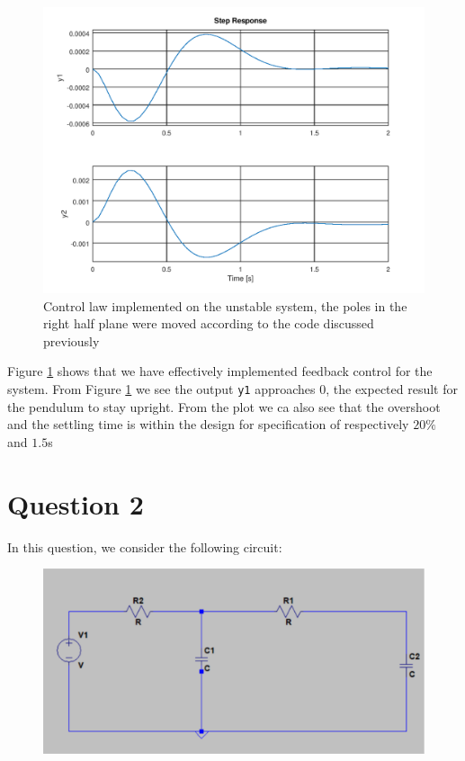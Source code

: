 \documentclass[a4paper, 12pt]{article}
\begin{document}
\begin{figure}[H]
  \centering
  \includegraphics[width=\textwidth]{images/control.png}
  \caption{Control law implemented on the unstable system, the poles in the right half plane were moved according to the code discussed previously}
  \label{fig:control}
\end{figure}

Figure \ref{fig:control} shows that we have effectively implemented feedback
control for the system. From Figure \ref{fig:control} we see the output
\texttt{y1} approaches $0$, the expected result for the pendulum to stay
upright. From the plot we ca also see that the overshoot and the settling time
is within the design for specification of respectively $20\%$ and $1.5$s





\section{Question 2}

In this question, we consider the following circuit:

\begin{figure}[H]
  \centering
  \includegraphics[width=.8\textwidth]{./images/circuit.png}
  \caption{}
  \label{fig:circuit}
\end{figure}
\end{document}
